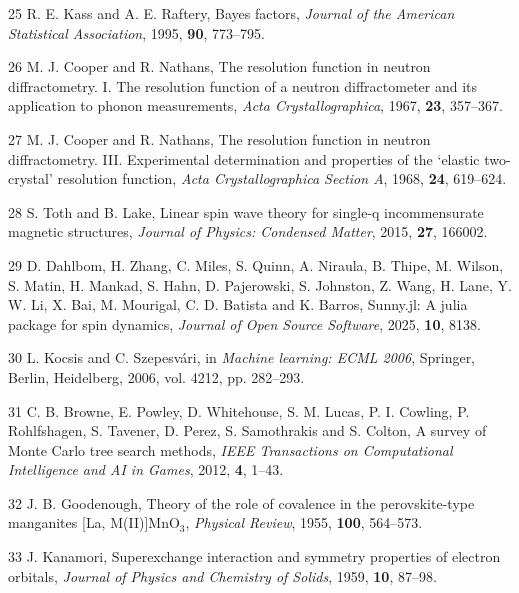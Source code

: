 \documentclass[
]{article}
\newenvironment{cslreferences}%
  {}%
  {\par}
\begin{document}
\begin{cslreferences}
\leavevmode\hypertarget{ref-kass1995}{}%
25 R. E. Kass and A. E. Raftery, Bayes factors, \emph{Journal of the
American Statistical Association}, 1995, \textbf{90}, 773--795.

\leavevmode\hypertarget{ref-coopernathans1967a}{}%
26 M. J. Cooper and R. Nathans, The resolution function in neutron
diffractometry. I. The resolution function of a neutron diffractometer
and its application to phonon measurements, \emph{Acta
Crystallographica}, 1967, \textbf{23}, 357--367.

\leavevmode\hypertarget{ref-coopernathans1968b}{}%
27 M. J. Cooper and R. Nathans, The resolution function in neutron
diffractometry. III. Experimental determination and properties of the
`elastic two-crystal' resolution function, \emph{Acta Crystallographica
Section A}, 1968, \textbf{24}, 619--624.

\leavevmode\hypertarget{ref-toth2015}{}%
28 S. Toth and B. Lake, Linear spin wave theory for single-q
incommensurate magnetic structures, \emph{Journal of Physics: Condensed
Matter}, 2015, \textbf{27}, 166002.

\leavevmode\hypertarget{ref-dahlbom2025sunny}{}%
29 D. Dahlbom, H. Zhang, C. Miles, S. Quinn, A. Niraula, B. Thipe, M.
Wilson, S. Matin, H. Mankad, S. Hahn, D. Pajerowski, S. Johnston, Z.
Wang, H. Lane, Y. W. Li, X. Bai, M. Mourigal, C. D. Batista and K.
Barros, Sunny.jl: A julia package for spin dynamics, \emph{Journal of
Open Source Software}, 2025, \textbf{10}, 8138.

\leavevmode\hypertarget{ref-kocsis2006uct}{}%
30 L. Kocsis and C. Szepesvári, in \emph{Machine learning: ECML 2006},
Springer, Berlin, Heidelberg, 2006, vol. 4212, pp. 282--293.

\leavevmode\hypertarget{ref-browne2012mcts}{}%
31 C. B. Browne, E. Powley, D. Whitehouse, S. M. Lucas, P. I. Cowling,
P. Rohlfshagen, S. Tavener, D. Perez, S. Samothrakis and S. Colton, A
survey of Monte Carlo tree search methods, \emph{IEEE Transactions on
Computational Intelligence and AI in Games}, 2012, \textbf{4}, 1--43.

\leavevmode\hypertarget{ref-goodenough1955}{}%
32 J. B. Goodenough, Theory of the role of covalence in the
perovskite-type manganites {[}La, M(II){]}MnO\(_3\), \emph{Physical
Review}, 1955, \textbf{100}, 564--573.

\leavevmode\hypertarget{ref-kanamori1959}{}%
33 J. Kanamori, Superexchange interaction and symmetry properties of
electron orbitals, \emph{Journal of Physics and Chemistry of Solids},
1959, \textbf{10}, 87--98.


\end{cslreferences}
\end{document}
